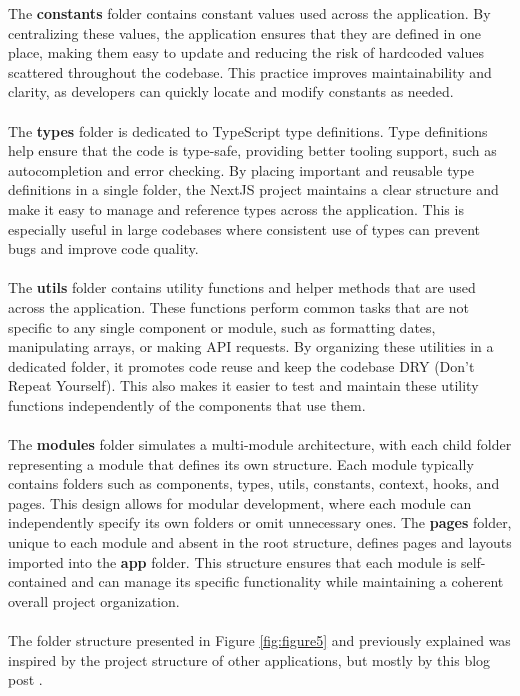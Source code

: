 \noindent The \textbf{constants} folder contains constant values used across the application. By centralizing these values, the application ensures that they are defined in one place, making them easy to update and reducing the risk of hardcoded values scattered throughout the codebase. This practice improves maintainability and clarity, as developers can quickly locate and modify constants as needed.
\\\\
\noindent The \textbf{types} folder is dedicated to TypeScript type definitions. Type definitions help ensure that the code is type-safe, providing better tooling support, such as autocompletion and error checking. By placing important and reusable type definitions in a single folder, the NextJS project maintains a clear structure and make it easy to manage and reference types across the application. This is especially useful in large codebases where consistent use of types can prevent bugs and improve code quality.
\\\\
\noindent The \textbf{utils} folder contains utility functions and helper methods that are used across the application. These functions perform common tasks that are not specific to any single component or module, such as formatting dates, manipulating arrays, or making API requests. By organizing these utilities in a dedicated folder, it promotes code reuse and keep the codebase DRY (Don't Repeat Yourself). This also makes it easier to test and maintain these utility functions independently of the components that use them.
\\\\
\noindent The \textbf{modules} folder simulates a multi-module architecture, with each child folder representing a module that defines its own structure. Each module typically contains folders such as components, types, utils, constants, context, hooks, and pages. This design allows for modular development, where each module can independently specify its own folders or omit unnecessary ones. The \textbf{pages} folder, unique to each module and absent in the root structure, defines pages and layouts imported into the \textbf{app} folder. This structure ensures that each module is self-contained and can manage its specific functionality while maintaining a coherent overall project organization.
\\\\
\noindent The folder structure presented in Figure \ref{fig:figure5} and previously explained was inspired by the project structure of other applications, but mostly by this blog post \cite{react-folder-structure}.

